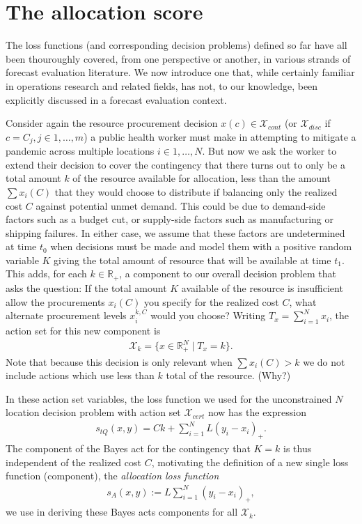 \documentclass{article}
\begin{document}
\section{The allocation score}

The loss functions (and corresponding decision problems) defined so far have all been thouroughly covered, from one perspective or another, in various strands of forecast evaluation literature.  We now introduce one that, while certainly familiar in operations research and related fields, has not, to our knowledge, been explicitly discussed in a forecast evaluation context. 

Consider again the resource procurement decision $x(c) \in \mathcal{X}_{cont}$ (or $\mathcal{X}_{disc}$ if $c = C_j, j \in 1,\ldots,m$) a public health worker must make in 
attempting to mitigate a pandemic across multiple locations $i \in 1,\ldots,N$.  But now we ask the worker to extend their decision to cover the contingency that there turns out to only be a total amount $k$ of the resource available for allocation, less than the amount $\sum x_i(C)$ that they would choose to distribute if balancing only the realized cost $C$ against potential unmet demand.  This could be due to demand-side factors such as a budget cut, or supply-side factors such as manufacturing or shipping failures. In either case, we assume that these factors are undetermined at time $t_0$ when decisions must be made and model them with a positive random variable $K$ giving the total amount of resource that will be available
at time $t_1$.  This adds, for each $k \in \mathbb{R}_{+}$, a component to our overall decision problem that asks the question: If the total amount $K$ available of the resource is insufficient allow the procurements $x_i(C)$ you specify for the realized cost $C$, what alternate procurement levels $x_i^{k,C}$ would you choose? Writing $T_x = \sum_{i=1}^{N} x_i$, the action set for this new component is 
\begin{align}
\mathcal{X}_k = \{x \in \mathbb{R}_{+}^N \mid T_x = k\}.
\end{align}
Note that because this decision is only relevant when $\sum x_i(C)>k$ we do not include actions which use less than $k$ total of the resource. (Why?)
 
In these action set variables, the loss function we used for the unconstrained $N$ location decision problem with action set $\mathcal{X}_{cert}$ now has the expression
\begin{align}
s_{tQ}\left(x, y\right) = Ck + \sum_{i=1}^{N} L(y_i - x_i)_{+}.
\end{align}
The component of the Bayes act for the contingency that $K=k$ is thus independent of the realized cost $C$, motivating the definition of a new single loss function (component), the \emph{allocation loss function}
\begin{align}
s_{A}(x,y):= L\sum_{i=1}^{N} (y_i - x_i)_{+},
\end{align}
we use in deriving these Bayes acts components for all $\mathcal{X}_k$.
\end{document}
